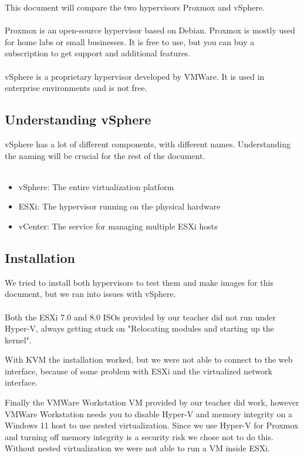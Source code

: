This document will compare the two hypervisors Proxmox and vSphere.
\\\\
Proxmox is an open-source hypervisor based on Debian. Proxmox is mostly used for home labs or small businesses. It is free to use, but you can buy a subscription to get support and additional features.
\\\\
vSphere is a proprietary hypervisor developed by VMWare. It is used in enterprise environments and is not free.

\subsection{Understanding vSphere}

vSphere has a lot of different components, with different names. Understanding the naming will be crucial for the rest of the document.
\\\\
\begin{itemize}
	\item vSphere: The entire virtualization platform
	\item ESXi: The hypervisor running on the physical hardware
	\item vCenter: The service for managing multiple ESXi hosts
\end{itemize}

\subsection{Installation}

We tried to install both hypervisors to test them and make images for this document, but we ran into issues with vSphere.
\\\\
Both the ESXi 7.0 and 8.0 ISOs provided by our teacher did not run under Hyper-V, always getting stuck on "Relocating modules and starting up the kernel".

With KVM the installation worked, but we were not able to connect to the web interface, because of some problem with ESXi and the virtualized network interface.

Finally the VMWare Workstation VM provided by our teacher did work, however VMWare Workstation needs you to disable Hyper-V and memory integrity on a Windows 11 host to use nested virtualization. Since we use Hyper-V for Proxmox and turning off memory integrity is a security risk we chose not to do this. Without nested virtualization we were not able to run a VM inside ESXi.